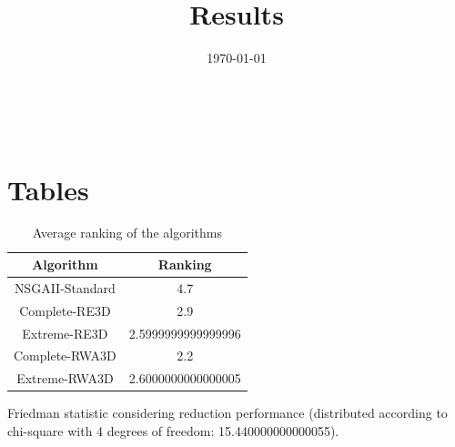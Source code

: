 \documentclass{article}
\title{Results}
\author{}
\date{\today}
\begin{document}
\oddsidemargin 0in \topmargin 0in\maketitle
\
\section{Tables}
\begin{table}[!htp]
\centering
\caption{Average ranking of the algorithms}
\begin{tabular}{c|c}
Algorithm&Ranking\\
\hline
NSGAII-Standard&4.7\\
Complete-RE3D&2.9\\
Extreme-RE3D&2.5999999999999996\\
Complete-RWA3D&2.2\\
Extreme-RWA3D&2.6000000000000005\\
\end{tabular}
\end{table}


Friedman statistic considering reduction performance (distributed according to chi-square with 4 degrees of freedom: 15.440000000000055).
\end{document}
